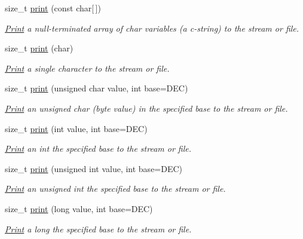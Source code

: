 \begin{DoxyCompactItemize}
size\+\_\+t \mbox{\hyperlink{class_print_acfe80773011eb17dfb52c2fba517a093}{print}} (const char\mbox{[}$\,$\mbox{]})
\begin{DoxyCompactList}\small\item\em \mbox{\hyperlink{class_print}{Print}} a null-\/terminated array of char variables (a c-\/string) to the stream or file. \end{DoxyCompactList}\item 
\mbox{\label{class_print_a1e411d07a8ffec5faf7ce485bac0f029}} 
size\+\_\+t \mbox{\hyperlink{class_print_a1e411d07a8ffec5faf7ce485bac0f029}{print}} (char)
\begin{DoxyCompactList}\small\item\em \mbox{\hyperlink{class_print}{Print}} a single character to the stream or file. \end{DoxyCompactList}\item 
size\+\_\+t \mbox{\hyperlink{class_print_ae35481e77567618140cd58d8b96d3747}{print}} (unsigned char value, int base=D\+EC)
\begin{DoxyCompactList}\small\item\em \mbox{\hyperlink{class_print}{Print}} an unsigned char (byte value) in the specified base to the stream or file. \end{DoxyCompactList}\item 
size\+\_\+t \mbox{\hyperlink{class_print_aa28ddbde83b14df73b41c919ecc4478f}{print}} (int value, int base=D\+EC)
\begin{DoxyCompactList}\small\item\em \mbox{\hyperlink{class_print}{Print}} an int the specified base to the stream or file. \end{DoxyCompactList}\item 
size\+\_\+t \mbox{\hyperlink{class_print_afcd7d3a184df961a502643e4fb638c52}{print}} (unsigned int value, int base=D\+EC)
\begin{DoxyCompactList}\small\item\em \mbox{\hyperlink{class_print}{Print}} an unsigned int the specified base to the stream or file. \end{DoxyCompactList}\item 
size\+\_\+t \mbox{\hyperlink{class_print_a0c663ac015ebc037ea044ba2e2cf2947}{print}} (long value, int base=D\+EC)
\begin{DoxyCompactList}\small\item\em \mbox{\hyperlink{class_print}{Print}} a long the specified base to the stream or file. \end{DoxyCompactList}\item 

\end{DoxyCompactItemize}
